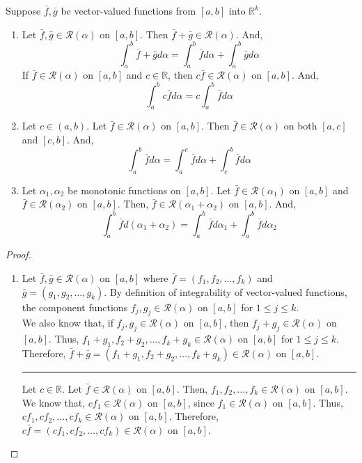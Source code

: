 \begin{commentary}
\begin{theorem}[properties]
	Suppose $\bar{f},\bar{g}$ be vector-valued functions from $[a,b]$ into $\mathbb{R}^k$.
\begin{enumerate}
	\item Let $\bar{f},\bar{g} \in \mathscr{R}(\alpha)$ on $[a,b]$.
	Then $\bar{f} + \bar{g} \in \mathscr{R}(\alpha)$.
	And,
	\[ \int_a^b \bar{f} + \bar{g} d\alpha = \int_a^b \bar{f} d\alpha + \int_a^b \bar{g} d \alpha \]
	If $\bar{f} \in \mathscr{R}(\alpha)$ on $[a,b]$ and $c \in \mathbb{R}$, then $c\bar{f} \in \mathscr{R}(\alpha)$ on $[a,b]$.
	And,
	\[ \int_a^b c\bar{f} d\alpha = c \int_a^b \bar{f} d\alpha \]
	\item Let $c \in (a,b)$.
	Let $\bar{f} \in \mathscr{R}(\alpha)$ on $[a,b]$.
	Then $\bar{f} \in \mathscr{R}(\alpha)$ on both $[a,c]$ and $[c,b]$.
	And,
	\[ \int_a^b \bar{f} d\alpha = \int_a^c \bar{f} d\alpha + \int_c^b \bar{f} d\alpha \]
	\item Let $\alpha_1,\alpha_2$ be monotonic functions on $[a,b]$.
	Let $\bar{f} \in \mathscr{R}(\alpha_1)$ on $[a,b]$ and $\bar{f} \in \mathscr{R}(\alpha_2)$ on $[a,b]$.
	Then, $\bar{f} \in \mathscr{R}(\alpha_1+\alpha_2)$ on $[a,b]$.
	And,
	\[ \int_a^b \bar{f}d(\alpha_1+\alpha_2) = \int_a^b \bar{f} d\alpha_1 + \int_a^b \bar{f} d\alpha_2 \]
\end{enumerate}
\end{theorem}
\begin{proof}
\begin{enumerate}
	\item
	Let $\bar{f},\bar{g} \in \mathscr{R}(\alpha)$ on $[a,b]$ where $\bar{f} = (f_1,f_2,\dots, f_k)$ and $\bar{g} = (g_1,g_2,\dots, g_k)$.
	By definition of integrability of vector-valued functions, the component functions $f_j,g_j \in \mathscr{R}(\alpha)$ on $[a,b]$ for $1 \le j \le k$.\\

	We also know that, if $f_j, g_j \in \mathscr{R}(\alpha)$ on $[a,b]$, then $f_j + g_j \in \mathscr{R}(\alpha)$ on $[a,b]$.
	Thus, $f_1+g_1, f_2+g_2,\dots, f_k + g_k \in \mathscr{R}(\alpha)$ on $[a,b]$ for $1 \le j \le k$.
	Therefore, $\bar{f}+\bar{g} = (f_1+g_1,f_2+g_2,\dots, f_k+g_k) \in \mathscr{R}(\alpha)$ on $[a,b]$.\\

	\hrule \vspace{1em}

	Let $c \in \mathbb{R}$.
	Let $\bar{f} \in \mathscr{R}(\alpha)$ on $[a,b]$.
	Then, $f_1,f_2,\dots,f_k \in \mathscr{R}(\alpha)$ on $[a,b]$.
	We know that, $cf_1 \in \mathscr{R}(\alpha)$ on $[a,b]$, since $f_1 \in \mathscr{R}(\alpha)$ on $[a,b]$.
	Thus, $cf_1,cf_2,\dots,cf_k \in \mathscr{R}(\alpha)$ on $[a,b]$.
	Therefore, $c\bar{f} = (cf_1,cf_2,\dots,cf_k) \in \mathscr{R}(\alpha)$ on $[a,b]$.\\


\end{enumerate}
\end{proof}
\end{commentary}
